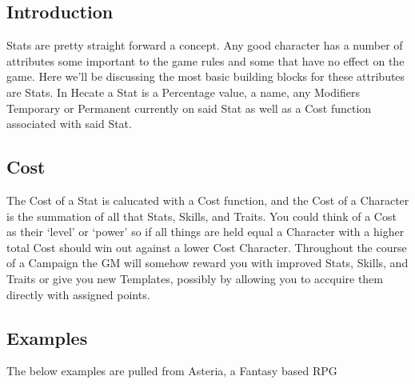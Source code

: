 
\subsection{Introduction}
\Glspl{Stat} are pretty straight forward a concept.  Any good character
has a number of attributes some important to the game rules and
some that have no effect on the game.  Here we'll be discussing
the most basic building blocks for these attributes are Stats.
In Hecate a \gls{Stat} is a Percentage value, a name, any
\glspl{Modifier} Temporary or Permanent currently on said \gls{Stat}
as well as a \gls{Cost} function associated with said \gls{Stat}.

\subsection{Cost}
The \gls{Cost} of a \gls{Stat} is calucated with a \gls{Cost}
function, and the \gls{Cost} of a \gls{Character} is the summation
of all that  \glspl{Stat},
\glspl{Skill}, and \glspl{Trait}.  You could think of a
 \gls{Cost} as their `level' or `power'
so if all things are held equal a \gls{Character} with a higher
total \gls{Cost} should win out against a lower \gls{Cost}
\gls{Character}.  Throughout the course of a \gls{Campaign} the
\gls{GM} will somehow reward you with improved \glspl{Stat}, \glspl{Skill},
and \glspl{Trait} or give you new \glspl{Template}, possibly by
allowing you to accquire them directly with assigned points.

\subsection{Examples}
The below examples are pulled from Asteria, a Fantasy based \gls{RPG}

